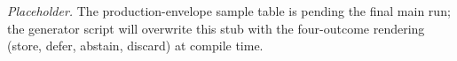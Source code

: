\begin{tcolorbox}[colback=gray!5,colframe=gray!40,arc=2pt,boxrule=0.5pt,left=8pt,right=8pt,top=6pt,bottom=6pt]
\textit{Placeholder.} The production-envelope sample table is pending the final main run; the generator script will overwrite this stub with the four-outcome rendering (store, defer, abstain, discard) at compile time.
\end{tcolorbox}
